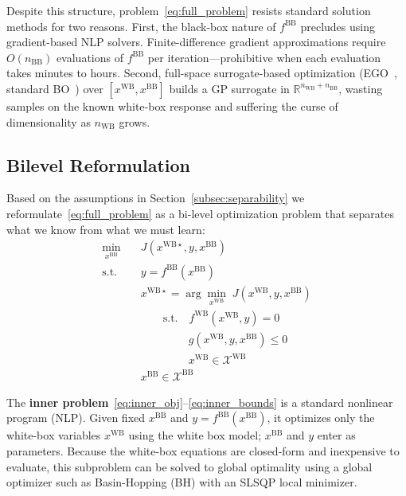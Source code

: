 \documentclass[12pt,a4paper]{article}%
\theoremstyle{plain}%
\theoremstyle{remark}%
\theoremstyle{definition}%
\def\WB{\mathrm{WB}}
\def\BB{\mathrm{BB}}
\begin{document}
Despite this structure, problem~\eqref{eq:full_problem} resists standard solution methods for two reasons. First, the black-box nature of $f^{\BB}$ precludes using gradient-based NLP solvers. Finite-difference gradient approximations require $O(n_{\BB})$ evaluations of $f^{\BB}$ per iteration---prohibitive when each evaluation takes minutes to hours. Second, full-space surrogate-based optimization (EGO~\cite{jones1998efficient}, standard BO~\cite{frazier2018tutorial}) over $[x^{\WB}, x^{\BB}]$ builds a GP surrogate in $\mathbb{R}^{n_{\WB}+n_{\BB}}$, wasting samples on the known white-box response and suffering the curse of dimensionality as $n_{\WB}$ grows.

\subsection{Bilevel Reformulation}\label{subsec:bilevel_reformulation}

Based on the assumptions in Section~\ref{subsec:separability} we reformulate~\eqref{eq:full_problem} as a bi-level optimization problem that separates what we know from what we must learn:
\begin{subequations}\label{eq:bilevel}
\begin{align}
    \min_{x^{\BB}} \quad & J(x^{\WB\star}, y, x^{\BB}) \label{eq:outer_obj}\\
    \text{s.t.} \quad & y = f^{\BB}(x^{\BB}) \label{eq:outer_blackbox}\\
    & x^{\WB\star} = \arg\min_{x^{\WB}} \; J(x^{\WB}, y, x^{\BB}) \label{eq:inner_obj}\\
    & \quad\quad \text{s.t.} \quad f^{\WB}(x^{\WB}, y) = 0 \label{eq:inner_process}\\
    & \quad\quad\quad\quad\; g(x^{\WB}, y, x^{\BB}) \leq 0 \label{eq:inner_ineq}\\
    & \quad\quad\quad\quad\; x^{\WB} \in \mathcal{X}^{\WB} \label{eq:inner_bounds}\\
    & x^{\BB} \in \mathcal{X}^{\BB} \label{eq:outer_bounds}
\end{align}
\end{subequations}

The \textbf{inner problem}~\eqref{eq:inner_obj}--\eqref{eq:inner_bounds} is a standard nonlinear program (NLP). Given fixed $x^{\BB}$ and $y = f^{\BB}(x^{\BB})$, it optimizes only the white-box variables $x^{\WB}$ using the white box model; $x^{\BB}$ and $y$ enter as parameters. Because the white-box equations are closed-form and inexpensive to evaluate, this subproblem can be solved to global optimality using a global optimizer such as Basin-Hopping (BH) with an SLSQP local minimizer.
\end{document}
